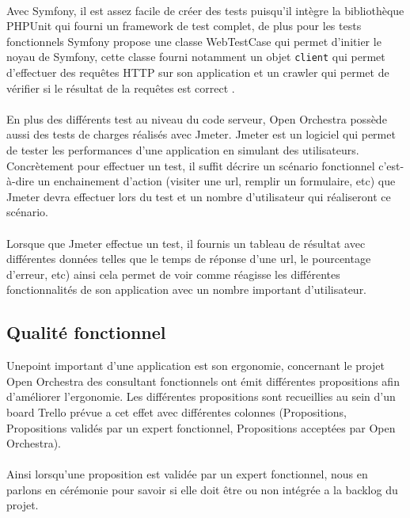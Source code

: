   \paragraph{}
 Avec Symfony, il est assez facile de créer des tests puisqu'il intègre la bibliothèque PHPUnit qui fourni un framework de test complet, de plus pour les tests fonctionnels Symfony propose une classe WebTestCase qui permet d'initier le noyau de Symfony, cette classe fourni notamment un objet \verb?client? qui permet d'effectuer des requêtes HTTP sur son application et un crawler qui permet de vérifier si le résultat de la requêtes est correct .
  \paragraph{}
  En plus des différents test au niveau du code serveur, Open Orchestra possède aussi des tests de charges réalisés avec Jmeter. Jmeter est un logiciel qui permet de tester les performances d'une application en simulant des utilisateurs. Concrètement pour effectuer un test, il suffit décrire un scénario fonctionnel c'est-à-dire un enchainement d'action (visiter une url, remplir un formulaire, etc) que Jmeter devra effectuer lors du test et un nombre d'utilisateur qui réaliseront ce scénario.
  
  \paragraph{}
  Lorsque que Jmeter effectue un test, il fournis un tableau de résultat avec différentes données telles que le temps de réponse d'une url, le pourcentage d'erreur, etc) ainsi cela permet de voir comme réagisse les différentes fonctionnalités de son application avec un nombre important d'utilisateur.
\subsection{Qualité fonctionnel}
Unepoint important d'une application est son ergonomie, concernant le projet Open Orchestra des consultant fonctionnels ont émit différentes propositions afin d'améliorer l'ergonomie.  Les différentes propositions sont recueillies au sein d'un board Trello prévue a cet effet avec différentes colonnes (Propositions, Propositions validés par un expert fonctionnel, Propositions acceptées par Open Orchestra). 
  \paragraph{}
  Ainsi lorsqu'une proposition est validée par un expert fonctionnel, nous en parlons en cérémonie pour savoir si elle doit être ou non intégrée a la backlog du projet. 